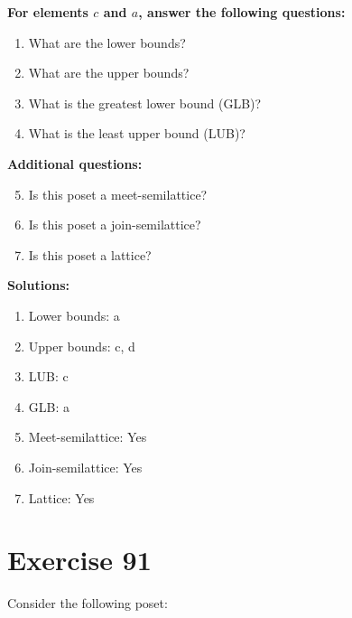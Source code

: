 \documentclass{article}
\begin{document}
    \textbf{For elements $c$ and $a$, answer the following questions:}
\begin{enumerate}
    \item What are the lower bounds?
    \item What are the upper bounds?
    \item What is the greatest lower bound (GLB)?
    \item What is the least upper bound (LUB)?
\end{enumerate}
    \hspace*{3ex} \textbf{Additional questions:}
\begin{enumerate}
    \setcounter{enumi}{4}
    \item Is this poset a meet-semilattice?
    \item Is this poset a join-semilattice?
    \item Is this poset a lattice?
\end{enumerate}

\textbf{Solutions:}
\begin{enumerate}
    \item Lower bounds: {a}
    \item Upper bounds: {c, d}
    \item LUB: c
    \item GLB: a
    \item Meet-semilattice: Yes
    \item Join-semilattice: Yes
    \item Lattice: Yes
\end{enumerate}
\newpage
\section*{Exercise 91}
Consider the following poset:
\begin{center}
\end{center}
\end{document}
